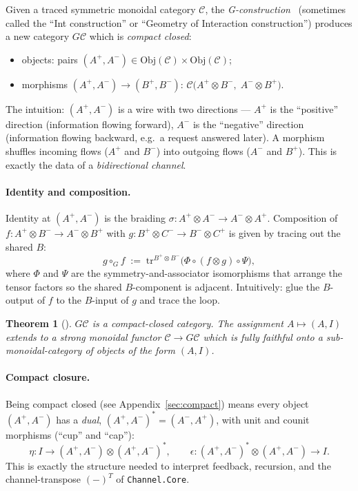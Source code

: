 \documentclass[11pt]{article}
\newtheorem{theorem}{Theorem}
\newcommand{\Obj}{\mathrm{Obj}}
\begin{document}
Given a traced symmetric monoidal category $\mathcal{C}$, the
\emph{G-construction}~\cite{JSV} (sometimes called
the ``Int construction'' or ``Geometry of Interaction
construction'') produces a new category $G\mathcal{C}$ which is
\emph{compact closed}:
\begin{itemize}
  \item objects: pairs $(A^+, A^-) \in \Obj(\mathcal{C}) \times \Obj(\mathcal{C})$;
  \item morphisms $(A^+, A^-) \to (B^+, B^-)$:
        $\mathcal{C}\bigl(A^+ \otimes B^-,\; A^- \otimes B^+\bigr)$.
\end{itemize}
The intuition: $(A^+, A^-)$ is a wire with two directions ---
$A^+$ is the ``positive'' direction (information flowing forward),
$A^-$ is the ``negative'' direction (information flowing backward,
e.g.\ a request answered later).  A morphism shuffles incoming
flows ($A^+$ and $B^-$) into outgoing flows ($A^-$ and $B^+$).  This
is exactly the data of a \emph{bidirectional channel}.

\paragraph{Identity and composition.}
Identity at $(A^+, A^-)$ is the braiding
$\sigma : A^+ \otimes A^- \to A^- \otimes A^+$.  Composition of
$f : A^+ \otimes B^- \to A^- \otimes B^+$ with
$g : B^+ \otimes C^- \to B^- \otimes C^+$ is given by tracing out
the shared $B$:
\[
  g \circ_G f \;:=\; \mathrm{tr}^{B^+ \otimes B^-}\!\bigl(
                      \Phi \circ (f \otimes g) \circ \Psi
                    \bigr),
\]
where $\Phi$ and $\Psi$ are the symmetry-and-associator isomorphisms
that arrange the tensor factors so the shared $B$-component is
adjacent.  Intuitively: glue the $B$-output of $f$ to the $B$-input
of $g$ and trace the loop.

\begin{theorem}[\cite{JSV}]
$G\mathcal{C}$ is a compact-closed category.  The assignment
$A \mapsto (A, I)$ extends to a strong monoidal functor
$\mathcal{C} \to G\mathcal{C}$ which is fully faithful onto a
sub-monoidal-category of objects of the form $(A, I)$.
\end{theorem}

\paragraph{Compact closure.}
Being compact closed (see Appendix~\ref{sec:compact}) means every
object $(A^+, A^-)$ has a \emph{dual}, $(A^+, A^-)^* = (A^-, A^+)$,
with unit and counit morphisms (``cup'' and ``cap''):
\[
  \eta : I \to (A^+, A^-) \otimes (A^+, A^-)^*,
  \qquad
  \epsilon : (A^+, A^-)^* \otimes (A^+, A^-) \to I.
\]
This is exactly the structure needed to interpret feedback,
recursion, and the channel-transpose $(-)^T$ of
\texttt{Channel.Core}.
\end{document}
